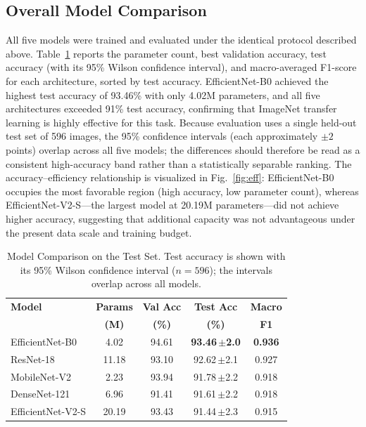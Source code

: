 \documentclass[conference]{IEEEtran}
\begin{document}
\subsection{Overall Model Comparison}
All five models were trained and evaluated under the identical protocol described above. Table~\ref{tab:model_comparison} reports the parameter count, best validation accuracy, test accuracy (with its 95\% Wilson confidence interval), and macro-averaged F1-score for each architecture, sorted by test accuracy. EfficientNet-B0 achieved the highest test accuracy of 93.46\% with only 4.02M parameters, and all five architectures exceeded 91\% test accuracy, confirming that ImageNet transfer learning is highly effective for this task. Because evaluation uses a single held-out test set of 596 images, the 95\% confidence intervals (each approximately $\pm2$ points) overlap across all five models; the differences should therefore be read as a consistent high-accuracy band rather than a statistically separable ranking. The accuracy--efficiency relationship is visualized in Fig.~\ref{fig:eff}: EfficientNet-B0 occupies the most favorable region (high accuracy, low parameter count), whereas EfficientNet-V2-S---the largest model at 20.19M parameters---did not achieve higher accuracy, suggesting that additional capacity was not advantageous under the present data scale and training budget.

\begin{table}[htbp]
\caption{Model Comparison on the Test Set. Test accuracy is shown with its 95\% Wilson confidence interval ($n=596$); the intervals overlap across all models.}
\label{tab:model_comparison}
\centering
\begin{tabular}{lcccc}
\toprule
\textbf{Model} & \textbf{Params} & \textbf{Val Acc} & \textbf{Test Acc} & \textbf{Macro} \\
 & \textbf{(M)} & \textbf{(\%)} & \textbf{(\%)} & \textbf{F1} \\
\midrule
EfficientNet-B0   & 4.02  & 94.61 & \textbf{93.46\,$\pm$2.0} & \textbf{0.936} \\
ResNet-18         & 11.18 & 93.10 & 92.62\,$\pm$2.1 & 0.927 \\
MobileNet-V2      & 2.23  & 93.94 & 91.78\,$\pm$2.2 & 0.918 \\
DenseNet-121      & 6.96  & 91.41 & 91.61\,$\pm$2.2 & 0.918 \\
EfficientNet-V2-S & 20.19 & 93.43 & 91.44\,$\pm$2.3 & 0.915 \\
\bottomrule
\end{tabular}
\end{table}
\end{document}
